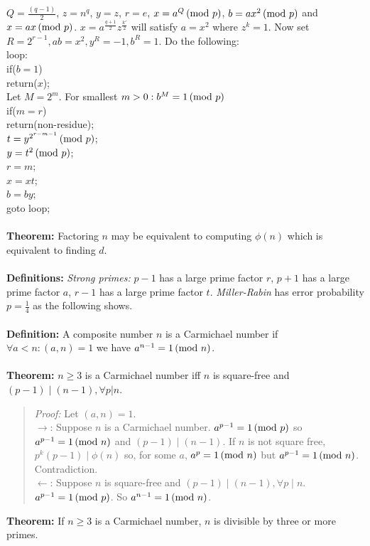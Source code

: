 $Q= {\frac {(q-1)} 2}$, $z = n^q$,
$y=z$, $r=e$,  $x=a^Q \thinspace \textnormal{(mod } p \textnormal{)}$, $b=ax^2 \thinspace \textnormal{(mod } p \textnormal{)}$ and  $x= ax \thinspace \textnormal{(mod } p \textnormal{)}$.
$x= a^{\frac {q+1} 2} z^{\frac {k'} 2}$ will satisfy $a= x^2$ where $z^k=1$.
Now set $R=2^{r-1}, ab=x^2, y^R= -1, b^R=1$.  Do the following:
\\
\jt loop: \\
\jt\jt  if($b=1$) \\
\jt\jt\jt   return($x$); \\
\jt\jt  Let $M=2^m$. For smallest $m>0: b^M= 1 \thinspace \textnormal{(mod } p \textnormal{)}$\\
\jt\jt  if($m=r$) \\
\jt \jt \jt return(non-residue);\\
\jt \jt $t= y^{2^{r-m-1}} \thinspace \textnormal{(mod } p \textnormal{)}$;\\
\jt \jt $y= t^2 \thinspace \textnormal{(mod } p \textnormal{)}$; \\
\jt \jt $r=m;$ \\
\jt \jt $x=xt;$ \\
\jt \jt $b=by;$ \\
\jt \jt goto loop;
\\
\\
{\bf Theorem: } Factoring $n$ may be equivalent to computing $\phi(n)$ which is equivalent to
finding $d$.\\
\\
{\bf Definitions: }
\emph{Strong primes: }
$p-1$ has a large prime factor $r$,
$p+1$ has a large prime factor $a$,
$r-1$ has a large prime factor $t$.
\emph{Miller-Rabin} has error probability $p= {\frac 1 4}$ as the following shows.
\\
\\
{\bf Definition: } A composite number $n$ is a Carmichael number if $\forall a <n: (a,n) = 1$
we have $a^{n-1} = 1 \thinspace \textnormal{(mod } n \textnormal{)}$.
\\
\\
{\bf Theorem: } $n \ge 3$ is a Carmichael number iff $n$ is square-free and $(p-1) \mid (n-1), \forall p | n$.
\begin{quote}
\emph{Proof: }
Let $(a, n) = 1$.\\
$\rightarrow$: Suppose $n$ is a Carmichael number. $a^{p-1} = 1 \thinspace \textnormal{(mod } p \textnormal{)}$ so $a^{p-1} = 1 \thinspace \textnormal{(mod } n \textnormal{)}$
and $(p-1) \mid (n-1)$.  If $n$ is not square free, $p^k (p-1) \mid \phi(n)$ so,
for some $a$, $a^p = 1 \thinspace \textnormal{(mod } n \textnormal{)}$ but $a^{p-1} = 1 \thinspace \textnormal{(mod } n \textnormal{)}$.  Contradiction.
\\
$\leftarrow$: 
Suppose $n$ is square-free and $(p-1) \mid (n-1), \forall p \mid n$. $a^{p-1} = 1 \thinspace \textnormal{(mod } p \textnormal{)}$.
So $a^{n-1} = 1 \thinspace \textnormal{(mod } n \textnormal{)}$.
\end{quote}
{\bf Theorem: } If $n \ge 3$ is a Carmichael number, $n$ is divisible by three or more primes.
